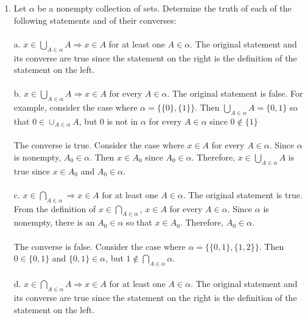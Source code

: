 \documentclass[]{article}
\begin{document}
\begin{enumerate}
    \item Let $\alpha$ be a nonempty collection of sets. Determine the truth of each of the following statements and of their converses:
    \\\\ a. $x \in \bigcup_{A \in \alpha} A \Rightarrow x \in A$ for at least one $A \in \alpha$.
    \newline The original statement and its converse are true since the statement on the right is the definition of the statement on the left.
    \\\\b. $x \in \bigcup_{A \in \alpha} A \Rightarrow x \in A$ for every $A \in \alpha$.
    \newline The original statement is false. For example, consider the case where $\alpha =\{\{0\},\{1\}\}$. Then $\bigcup_{A \in \alpha} A = \{0,1\}$ so that $0 \in \cup_{A \in \alpha}A$, but 0 is not in $\alpha$ for every $A \in \alpha$ since $0 \notin \{1\}$
    \\\\ The converse is true. Consider the case where $x \in A$ for every $A \in \alpha$. Since $\alpha$ is nonempty, $A_0 \in \alpha$. Then $x \in A_0$ since $A_0 \in \alpha$. Therefore, $x \in \bigcup_{A \in \alpha} A$ is true since $x \in A_0$ and $A_0 \in \alpha$.
    \\\\c. $x \in \bigcap_{A \in \alpha} \Rightarrow x \in A$ for at least one $A \in \alpha$.
    \newline The original statement is true. From the definition of $x \in \bigcap_{A \in \alpha}$, $x \in A$ for every $A \in \alpha$. Since $\alpha$ is nonempty, there is an $A_0 \in \alpha$ so that $x \in A_0$. Therefore, $A_0 \in \alpha$.
    \\\\ The converse is false.
    \newline Consider the case where $\alpha = \{\{0,1\},\{1,2\}\}$. Then $0 \in \{0,1\}$ and $\{0,1\} \in \alpha$, but $1 \notin \bigcap_{A \in \alpha} \alpha$.
    \\\\d. $x \in \bigcap_{A \in \alpha} A \Rightarrow x \in A$ for at least one $A \in \alpha$.
    \newline The original statement and its converse are true since the statement on the right is the definition of the statement on the left.
    

\end{enumerate}
\end{document}
